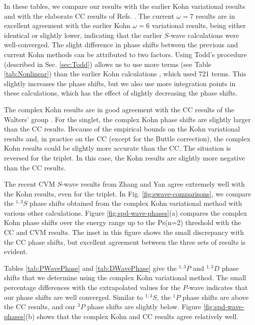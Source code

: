 \documentclass[preprint,showpacs,showkeys,preprintnumbers,amsmath,amssymb,longbibliography,pra,aps]{revtex4-1}
\begin{document}
In these tables, we compare our results with the earlier Kohn variational 
results \cite{VanReeth2003,VanReeth2004} and with the elaborate CC results of 
Refs. \cite{Blackwood2002,Walters2004}. The current $\omega = 7$ results are 
in excellent agreement with the earlier Kohn $\omega = 6$ variational 
results, being either identical or slightly lower, indicating that the 
earlier $S$-wave calculations were well-converged. The slight difference in 
phase shifts between the previous and current Kohn methods can be attributed 
to two factors. Using Todd's procedure (described in Sec. \ref{sec:Todd}) 
allows us to use more terms (see Table \ref{tab:Nonlinear}) than the earlier 
Kohn calculations \cite{VanReeth2003,VanReeth2004}, which used 721 terms. 
This slightly increases the phase shifts, but we also use more integration 
points in these calculations, which has the effect of slightly decreasing the 
phase shifts.

The complex Kohn results are in good agreement with the CC results of the 
Walters' group \cite{Blackwood2002,Walters2004}. For the singlet, the complex 
Kohn phase shifts are slightly larger than the CC results. Because of the 
empirical bounds on the Kohn variational results and, in practice on the CC
(except for the Buttle correction), the complex Kohn results could be slightly 
more accurate than the CC. The situation is reversed for the triplet. In this
case, the Kohn results are slightly more negative than the CC results.

The recent CVM $S$-wave results from Zhang and Yan \cite{Zhang2012} agree 
extremely well with the Kohn results, even for the triplet. In Fig.
\ref{fig:swave-comparisons},
we compare the $^{1,3}S$ phase shifts obtained from 
the complex Kohn variational method with various other calculations. Figure 
\ref{fig:spd-wave-phases}(a) compares the complex Kohn phase shifts over the 
energy range up to the Ps(n=2) threshold with the CC and CVM results. The 
inset in this figure shows the small discrepancy with the CC phase shifts, 
but excellent agreement between the three sets of results is evident. 

Tables \ref{tab:PWavePhase} and \ref{tab:DWavePhase} give the $^{1,3}P$ and
$^{1,3}D$
 phase shifts that we determine using the complex Kohn variational 
method. The small percentage differences with the extrapolated values for the 
$P$-wave indicates that our phase shifts are well converged. Similar to $^{1,3}S$,
the $^1P$ phase shifts are above the CC results, and our $^3P$ phase 
shifts are slightly below. Figure \ref{fig:spd-wave-phases}(b) shows that the 
complex Kohn and CC results agree relatively well.
\end{document}
